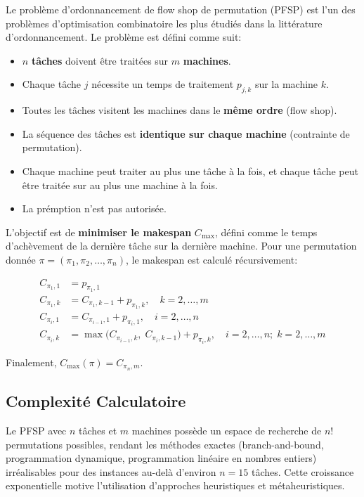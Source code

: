 \documentclass[12pt,a4paper,oneside]{report}
\begin{document}
Le probl\`eme d'ordonnancement de flow shop de permutation (PFSP) est l'un des probl\`emes d'optimisation combinatoire les plus \'etudi\'es dans la litt\'erature d'ordonnancement. Le probl\`eme est d\'efini comme suit:

\begin{itemize}[itemsep=4pt]
    \item $n$ \textbf{t\^aches} doivent \^etre trait\'ees sur $m$ \textbf{machines}.
    \item Chaque t\^ache $j$ n\'ecessite un temps de traitement $p_{j,k}$ sur la machine $k$.
    \item Toutes les t\^aches visitent les machines dans le \textbf{m\^eme ordre} (flow shop).
    \item La s\'equence des t\^aches est \textbf{identique sur chaque machine} (contrainte de permutation).
    \item Chaque machine peut traiter au plus une t\^ache \`a la fois, et chaque t\^ache peut \^etre trait\'ee sur au plus une machine \`a la fois.
    \item La pr\'emption n'est pas autoris\'ee.
\end{itemize}

L'objectif est de \textbf{minimiser le makespan} $C_{\max}$, d\'efini comme le temps d'ach\`evement de la derni\`ere t\^ache sur la derni\`ere machine. Pour une permutation donn\'ee $\pi = (\pi_1, \pi_2, \dots, \pi_n)$, le makespan est calcul\'e r\'ecursivement:

\begin{equation}\label{eq:makespan}
\begin{aligned}
C_{\pi_1, 1} &= p_{\pi_1, 1} \\[2pt]
C_{\pi_1, k} &= C_{\pi_1, k-1} + p_{\pi_1, k}, \quad k = 2,\dots,m \\[2pt]
C_{\pi_i, 1} &= C_{\pi_{i-1}, 1} + p_{\pi_i, 1}, \quad i = 2,\dots,n \\[2pt]
C_{\pi_i, k} &= \max\bigl(C_{\pi_{i-1}, k},\; C_{\pi_i, k-1}\bigr) + p_{\pi_i, k}, \quad i=2,\dots,n;\; k=2,\dots,m
\end{aligned}
\end{equation}

Finalement, $C_{\max}(\pi) = C_{\pi_n, m}$.

\subsection{Complexit\'e Calculatoire}

Le PFSP avec $n$ t\^aches et $m$ machines poss\`ede un espace de recherche de $n!$ permutations possibles, rendant les m\'ethodes exactes (branch-and-bound, programmation dynamique, programmation lin\'eaire en nombres entiers) irr\'ealisables pour des instances au-del\`a d'environ $n=15$ t\^aches. Cette croissance exponentielle motive l'utilisation d'approches heuristiques et m\'etaheuristiques.
\end{document}
